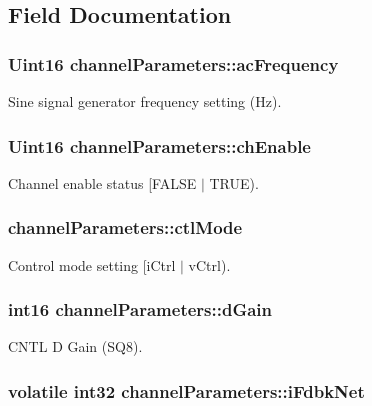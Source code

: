 \subsection{Field Documentation}
\hypertarget{structchannel_parameters_a817bac18060f842dca3867eeb7e2d06c}{
\subsubsection[{ac\-Frequency}]{\setlength{\rightskip}{0pt plus 5cm}Uint16 channel\-Parameters\-::ac\-Frequency}}\label{structchannel_parameters_a817bac18060f842dca3867eeb7e2d06c}
Sine signal generator frequency setting (Hz). \hypertarget{structchannel_parameters_af99576e00746544eab1d4e88d12f39b4}{
\subsubsection[{ch\-Enable}]{\setlength{\rightskip}{0pt plus 5cm}Uint16 channel\-Parameters\-::ch\-Enable}}\label{structchannel_parameters_af99576e00746544eab1d4e88d12f39b4}
Channel enable status \mbox{[}F\-A\-L\-S\-E $|$ T\-R\-U\-E). \hypertarget{structchannel_parameters_ab31dab8e873272dd15641943b20e56a5}{
\subsubsection[{ctl\-Mode}]{ channel\-Parameters\-::ctl\-Mode}}\label{structchannel_parameters_ab31dab8e873272dd15641943b20e56a5}
Control mode setting \mbox{[}i\-Ctrl $|$ v\-Ctrl). \hypertarget{structchannel_parameters_a3fe483bd1d92d76223cbc97d9f32a3de}{
\subsubsection[{d\-Gain}]{\setlength{\rightskip}{0pt plus 5cm}int16 channel\-Parameters\-::d\-Gain}}\label{structchannel_parameters_a3fe483bd1d92d76223cbc97d9f32a3de}
C\-N\-T\-L D Gain (S\-Q8). \hypertarget{structchannel_parameters_ad4f53b220d97af172b01f1a6d57a9635}{
\subsubsection[{i\-Fdbk\-Net}]{\setlength{\rightskip}{0pt plus 5cm}volatile int32 channel\-Parameters\-::i\-Fdbk\-Net}}\label{structchannel_parameters_ad4f53b220d97af172b01f1a6d57a9635}
